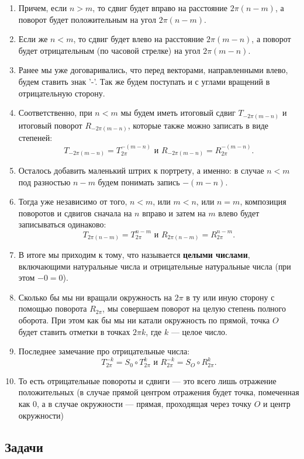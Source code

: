 \begin{enumerate}
\item Причем, если $n>m$, то сдвиг будет вправо на расстояние $2\pi(n-m)$, а поворот будет положительным на угол $2\pi(n-m)$.
\item Если же $n<m$, то сдвиг будет влево на расстояние $2\pi(m-n)$, а поворот будет отрицательным (по часовой стрелке) на угол $2\pi(m-n)$.
\item Ранее мы уже договаривались, что перед векторами, направленными влево, будем ставить знак '-'. Так же будем поступать и с углами вращений в отрицательную сторону.
\item Соответственно, при $n<m$ мы будем иметь итоговый сдвиг $T_{-2\pi(m-n)}$ и итоговый поворот $R_{-2\pi(m-n)}$, которые также можно записать в виде степеней:
$$
T_{-2\pi(m-n)}=T_{2\pi}^{-(m-n)}\mbox{ и }R_{-2\pi(m-n)}=R_{2\pi}^{-(m-n)}.
$$
\item Осталось добавить маленький штрих к портрету, а именно: в случае $n<m$ под разностью $n-m$ будем понимать запись $-(m-n)$.
\item Тогда уже независимо от того, $n<m$, или $m<n$, или $n=m$, композиция поворотов и сдвигов сначала на $n$ вправо и затем на $m$ влево будет записываться одинаково:
$$
T_{2\pi(n-m)}=T_{2\pi}^{n-m}\mbox{ и }R_{2\pi(n-m)}=R_{2\pi}^{n-m}.
$$
\item В итоге мы приходим к тому, что называется \textbf{целыми числами}, включающими натуральные числа и отрицательные натуральные числа (при этом $-0=0$).
\item Сколько бы мы ни вращали окружность на $2\pi$ в ту или иную сторону с помощью поворота $R_{2\pi}$, мы совершаем поворот на целую степень полного оборота. При этом как бы мы ни катали окружность по прямой, точка $O$ будет ставить отметки в точках $2\pi k$, где $k$ --- целое число.
\item Последнее замечание про отрицательные числа:
$$
T_{2\pi}^{-k}=S_0\circ T_{2\pi}^k\mbox{ и }R_{2\pi}^{-k}=S_O\circ R_{2\pi}^k.
$$
\item То есть отрицательные повороты и сдвиги --- это всего лишь отражение положительных (в случае прямой центром отражения будет точка, помеченная как 0, а в случае окружности --- прямая, проходящая через точку $O$ и центр окружности)
\end{enumerate}
\subsection{Задачи}





